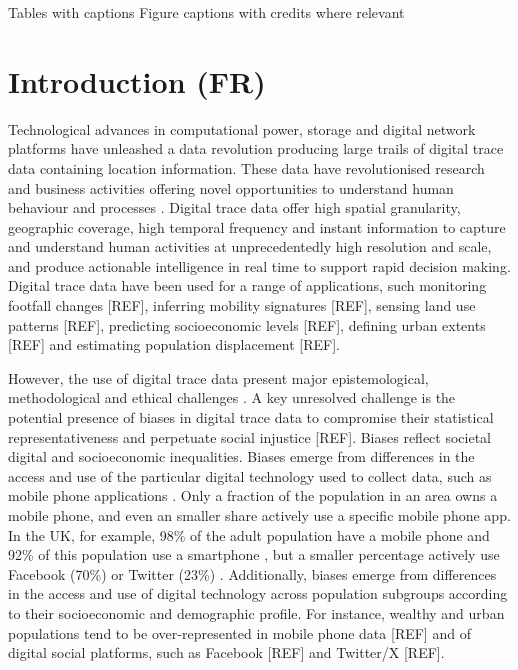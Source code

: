 \documentclass[]{rsos}%
\begin{document}
Tables with captions Figure captions with credits where relevant

\newpage

\section{Introduction (FR)}\label{introduction-fr}

Technological advances in computational power, storage and digital
network platforms have unleashed a data revolution producing large
trails of digital trace data containing location information. These data
have revolutionised research and business activities offering novel
opportunities to understand human behaviour and processes
\citep{rowe23-bigdata}. Digital trace data offer high spatial granularity,
geographic coverage, high temporal frequency and instant information to
capture and understand human activities at unprecedentedly high
resolution and scale, and produce actionable intelligence in real time
to support rapid decision making. Digital trace data have been used for
a range of applications, such monitoring footfall changes {[}REF{]},
inferring mobility signatures {[}REF{]}, sensing land use patterns {[}REF{]},
predicting socioeconomic levels {[}REF{]}, defining urban extents {[}REF{]} and
estimating population displacement {[}REF{]}.

However, the use of digital trace data present major epistemological,
methodological and ethical challenges \citep{rowe23-bigdata}. A key
unresolved challenge is the potential presence of biases in digital
trace data to compromise their statistical representativeness and
perpetuate social injustice {[}REF{]}. Biases reflect societal digital and
socioeconomic inequalities. Biases emerge from differences in the access
and use of the particular digital technology used to collect data, such
as mobile phone applications \citep{wesolowski13-biases}. Only a fraction of
the population in an area owns a mobile phone, and even an smaller share
actively use a specific mobile phone app. In the UK, for example, 98\% of
the adult population have a mobile phone and 92\% of this population use
a smartphone \citep{ofcom23}, but a smaller percentage actively use Facebook
(70\%) or Twitter (23\%) \citep{statista24}. Additionally, biases emerge from
differences in the access and use of digital technology across
population subgroups according to their socioeconomic and demographic
profile. For instance, wealthy and urban populations tend to be
over-represented in mobile phone data {[}REF{]} and of digital social
platforms, such as Facebook {[}REF{]} and Twitter/X {[}REF{]}.
\end{document}

